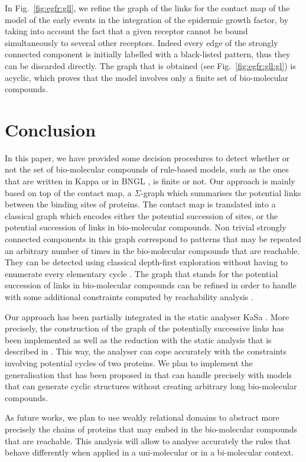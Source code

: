 \documentclass{entcs}
\begin{document}
\begin{exmp}
In Fig.~\ref{fig:egfr:gll}, we refine the graph of the links  for the contact map of the model of the early events in the integration of the epidermic growth factor, by taking into account the fact that a given receptor cannot be bound simultaneously to several other receptors.
Indeed every edge of the strongly connected component is initially labelled with a black-listed pattern, thus they can be discarded directly. The graph that is obtained (see Fig.~\ref{fig:egfr:gll:gl}) is acyclic, which proves that the model involves only a finite set of bio-molecular compounds.
\end{exmp}


\label{sec:refinement}
\section{Conclusion}

In this paper, we have provided some decision procedures
to detect whether or not the set of bio-molecular compounds of rule-based models, such as the ones that are written in Kappa \cite{DBLP:journals/tcs/DanosL04} or in BNGL \cite{BNGL}, is finite or not.
Our approach is mainly based on top of the contact map, a $\Sigma$-graph which summarises the potential links between the binding sites of proteins. The contact map is translated into a classical graph which encodes either the potential succession of sites, or the potential succession of links in bio-molecular compounds.
Non trivial strongly connected components in this graph correspond to  patterns that may be repeated an arbitrary number of times in the bio-molecular compounds that are reachable. They can be detected using classical depth-first exploration without having to enumerate every elementary cycle \cite{tarjan}.
The graph that stands for the potential succession of links in bio-molecular compounds can be refined in order to handle with some additional constraints  computed by reachability analysis \cite{DanosEtAl-VMCAI08,SASB2016,KaSa}.

Our approach has been partially integrated in the static analyser KaSa \cite{KaSa}. More precisely, the construction of the graph of the potentially
successive links has been implemented as well as the reduction with the static analysis that is described in \cite{SASB2016}. This way, the analyser can cope accurately with the constraints involving potential cycles of two proteins.  We plan to implement the generalisation that has been proposed in \cite{afp} that can handle precisely with models that can generate cyclic structures without creating arbitrary long bio-molecular compounds.

As future works, we plan to use weakly relational domains \cite{DBLP:conf/sas/Mine02} to abstract more precisely the chains of proteins that may embed in the bio-molecular compounds that are reachable. This analysis will allow to analyse accurately the rules that behave differently when applied in a uni-molecular or in a bi-molecular context.



\end{document}

